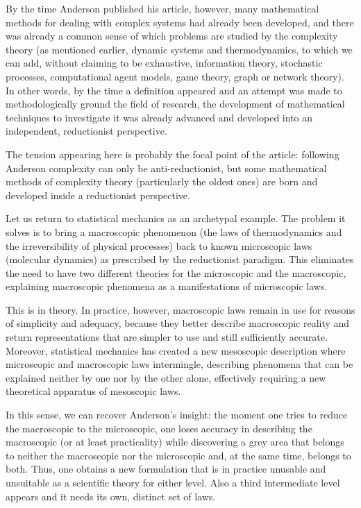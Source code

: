 By the time Anderson published his article, however, many mathematical methods for dealing with complex systems had already been developed, and there was already a common sense of which problems are studied by the complexity theory (as mentioned earlier, dynamic systems and thermodynamics, to which we can add, without claiming to be exhaustive, information theory, stochastic processes, computational agent models, game theory, graph or network theory).
In other words, by the time a definition appeared and an attempt was made to methodologically ground the field of research, the development of mathematical techniques to investigate it was already advanced and developed into an independent, reductionist perspective.

The tension appearing here is probably the focal point of the article: following Anderson complexity can only be anti-reductionist, but some mathematical methods of complexity theory (particularly the oldest ones) are born and developed inside a reductionist perspective.

Let us return to statistical mechanics as an archetypal example. The problem it solves is to bring a macroscopic phenomenon (the laws of thermodynamics and the irreversibility of physical processes) back to known microscopic laws (molecular dynamics) as prescribed by the reductionist paradigm.  This eliminates the need to have two different theories for the microscopic and the macroscopic, explaining macroscopic phenomena as a manifestations of microscopic laws.

This is in theory. In practice, however, macroscopic laws remain in use for reasons of simplicity and adequacy, because they better describe macroscopic reality and return representations that are simpler to use and still sufficiently accurate.
Moreover, statistical mechanics has created a new mesoscopic description where microscopic and macroscopic laws intermingle, describing phenomena that can be explained neither by one nor by the other alone, effectively requiring a new theoretical apparatus of mesoscopic laws.

In this sense, we can recover Anderson's insight: the moment one tries to reduce the macroscopic to the microscopic, one loses accuracy in describing the macroscopic (or at least practicality) while discovering a grey area that belongs to neither the macroscopic nor the microscopic and, at the same time, belongs to both.
Thus, one obtains a new formulation that is in practice unusable and unsuitable as a scientific theory for either level. Also a third intermediate level appears and it needs its own, distinct set of laws.

